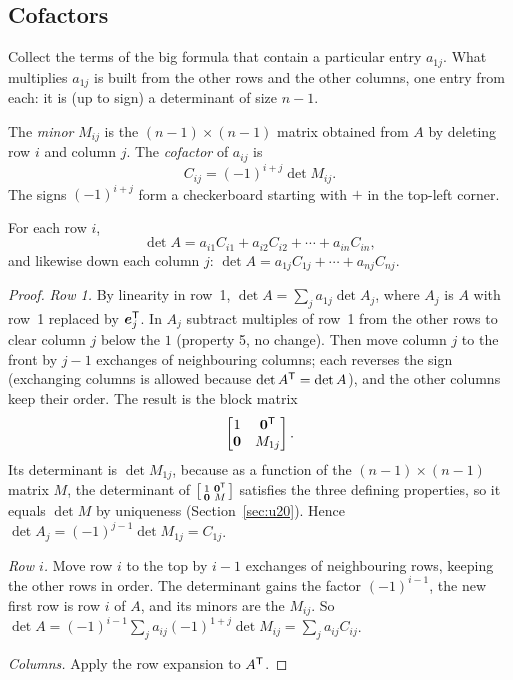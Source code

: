 \subsection{Cofactors}

Collect the terms of the big formula that contain a particular entry $a_{1j}$. What
multiplies $a_{1j}$ is built from the other rows and the other columns, one entry from each:
it is (up to sign) a determinant of size $n-1$.

\begin{definition}\label{def:u21-cofactor}
The \emph{minor} $M_{ij}$ is the $(n-1)\times(n-1)$ matrix obtained from $A$ by deleting row
$i$ and column $j$. The \emph{cofactor} of $a_{ij}$ is
\[
  C_{ij}=(-1)^{i+j}\det M_{ij}.
\]
The signs $(-1)^{i+j}$ form a checkerboard starting with $+$ in the top-left corner.
\end{definition}

\begin{theorem}\label{thm:u21-cofactor}
For each row $i$,
\[
  \det A=a_{i1}C_{i1}+a_{i2}C_{i2}+\cdots+a_{in}C_{in},
\]
and likewise down each column $j$: $\det A=a_{1j}C_{1j}+\cdots+a_{nj}C_{nj}$.
\end{theorem}

\begin{proof}
\emph{Row 1.} By linearity in row~1, $\det A=\sum_j a_{1j}\det A_j$, where $A_j$ is $A$ with
row~1 replaced by $\boldsymbol{e}_j^{\mathsf{T}}$. In $A_j$ subtract multiples of row~1 from the other rows to
clear column $j$ below the $1$ (property 5, no change). Then move column $j$ to the front by
$j-1$ exchanges of neighbouring columns; each reverses the sign (exchanging columns is allowed
because $\det A^{\mathsf{T}}=\det A$), and the other columns keep their order. The result is the block matrix
\[
  \begin{bmatrix}1&\boldsymbol{0}^{\mathsf{T}}\\ \boldsymbol{0}&M_{1j}\end{bmatrix}.
\]
Its determinant is $\det M_{1j}$, because as a function of the $(n-1)\times(n-1)$ matrix $M$,
the determinant of $\left[\begin{smallmatrix}1&\boldsymbol{0}^{\mathsf{T}}\\ \boldsymbol{0}&M\end{smallmatrix}\right]$
satisfies the three defining properties, so it equals $\det M$ by uniqueness
(Section~\ref{sec:u20}). Hence $\det A_j=(-1)^{j-1}\det M_{1j}=C_{1j}$.

\emph{Row $i$.} Move row $i$ to the top by $i-1$ exchanges of neighbouring rows, keeping the
other rows in order. The determinant gains the factor $(-1)^{i-1}$, the new first row is row
$i$ of $A$, and its minors are the $M_{ij}$. So
$\det A=(-1)^{i-1}\sum_j a_{ij}(-1)^{1+j}\det M_{ij}=\sum_j a_{ij}C_{ij}$.

\emph{Columns.} Apply the row expansion to $A^{\mathsf{T}}$.
\end{proof}

